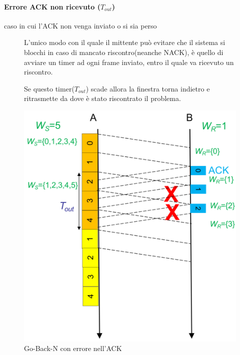 \paragraph{Errore ACK non ricevuto ($T_{out}$)} caso in cui l'ACK non venga inviato o si sia perso

\begin{figure}[htbp]
    \centering
    \begin{minipage}{0.55\textwidth}
        L'unico modo con il quale il mittente può evitare che il sistema si blocchi in caso di mancato riscontro(neanche NACK),  è quello di avviare un timer ad ogni frame inviato, entro il quale va ricevuto un riscontro.
        
        Se questo timer($T_{out}$) scade allora la finestra torna indietro e ritrasmette da dove è stato riscontrato il problema.
    \end{minipage}%
    \hfill
    \begin{minipage}{0.4\textwidth}
        \includegraphics[width=\linewidth]{images/gobacknerroreack.png}
        \caption{Go-Back-N con errore nell'ACK}
    \end{minipage}
\end{figure}


\newpage

